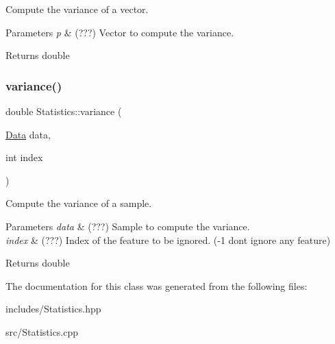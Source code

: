 Compute the variance of a vector. 


\begin{DoxyParams}{Parameters}
{\em p} & (???) Vector to compute the variance. \\
\hline
\end{DoxyParams}
\begin{DoxyReturn}{Returns}
double 
\end{DoxyReturn}
\mbox{\label{class_statistics_a0390754b117a9b7a637b44992ed2ebf6}} 
\subsubsection{\texorpdfstring{variance()}{variance()}\hspace{0.1cm}{\footnotesize\ttfamily [2/2]}}
{\footnotesize\ttfamily double Statistics\+::variance (\begin{DoxyParamCaption}\item[{\hyperlink{class_data}{Data}}]{data,  }\item[{int}]{index }\end{DoxyParamCaption})\hspace{0.3cm}{\ttfamily [static]}}



Compute the variance of a sample. 


\begin{DoxyParams}{Parameters}
{\em data} & (???) Sample to compute the variance. \\
\hline
{\em index} & (???) Index of the feature to be ignored. (-\/1 dont ignore any feature) \\
\hline
\end{DoxyParams}
\begin{DoxyReturn}{Returns}
double 
\end{DoxyReturn}


The documentation for this class was generated from the following files\+:\begin{DoxyCompactItemize}
\item 
includes/Statistics.\+hpp\item 
src/Statistics.\+cpp\end{DoxyCompactItemize}
